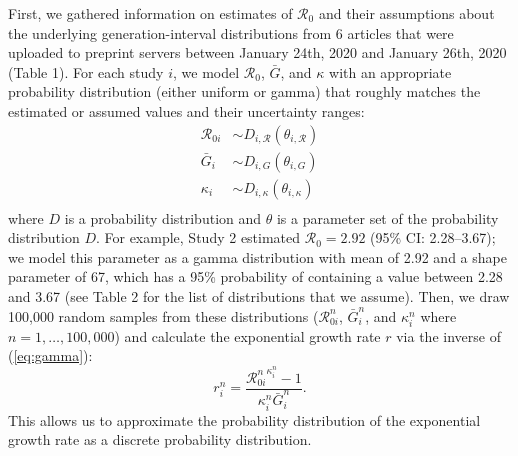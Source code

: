 \documentclass[12pt]{article}
\newcommand{\eref}[1]{(\ref{eq:#1})}
\begin{document}
First, we gathered information on estimates of $\mathcal R_0$ and their
assumptions about the underlying generation-interval distributions from
6 articles that were uploaded to
preprint servers between January 24th, 2020 and January 26th, 2020 (Table 1).
For each study $i$, we model $\mathcal R_0$, $\bar G$, and $\kappa$ with an appropriate probability distribution (either uniform or gamma) that roughly matches the estimated or assumed values and their uncertainty ranges:
\begin{equation}
\begin{aligned}
\mathcal R_{0i} &\sim D_{i, \mathcal R}(\theta_{i, \mathcal R})\\
{\bar G}_i &\sim D_{i, G}(\theta_{i, G})\\
\kappa_i &\sim D_{i, \kappa}(\theta_{i, \kappa})\\
\end{aligned}
\end{equation}
where $D$ is a probability distribution and $\theta$ is a parameter set of the probability distribution $D$.
For example, Study 2 estimated $\mathcal R_0 = 2.92$ (95\% CI: 2.28--3.67);
we model this parameter as a gamma distribution with mean of 2.92 and a shape parameter of 67, which has a 95\% probability of containing a value between 2.28 and 3.67 (see Table 2 for the list of distributions that we assume).
Then, we draw 100,000 random samples from these distributions ($\mathcal R_{0i}^n$, ${\bar G}_i^n$, and $\kappa_i^n$ where $n = 1, \dots, 100,000$) and calculate the exponential growth rate $r$ via the inverse of \eref{gamma}:
\begin{equation}
r_i^n = \frac{{\mathcal R_{0i}^n}^{\kappa_i^n} - 1}{\kappa_i^n \bar{G}_i^n}.
\end{equation}
This allows us to approximate the probability distribution of the exponential growth rate as a discrete probability distribution.
\end{document}
